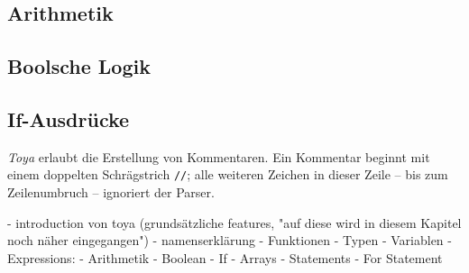 \subsection{Arithmetik}

\subsection{Boolsche Logik}

\subsection{If-Ausdrücke}

\textit{Toya} erlaubt die Erstellung von Kommentaren. Ein Kommentar beginnt mit einem doppelten Schrägstrich \texttt{//}; alle weiteren Zeichen in dieser Zeile -- bis zum Zeilenumbruch -- ignoriert der Parser.

- introduction von toya (grundsätzliche features, "auf diese wird in diesem Kapitel noch näher eingegangen")
- namenserklärung
- Funktionen
- Typen
- Variablen
- Expressions:
    - Arithmetik
    - Boolean
    - If
    - Arrays
- Statements
    - For Statement